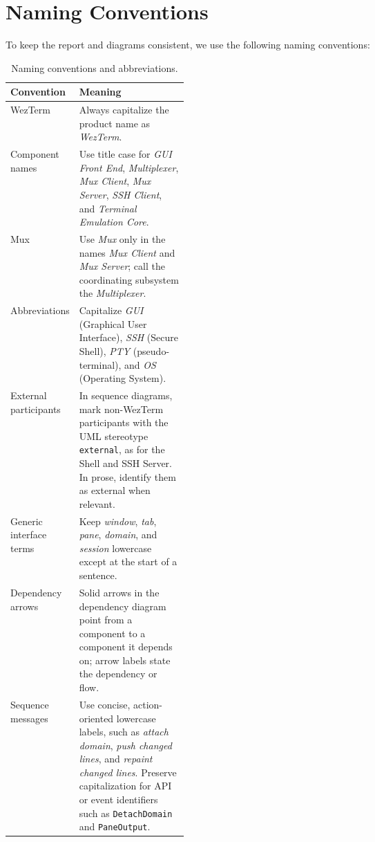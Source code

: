 \section{Naming Conventions}
\label{sec:naming-conventions}

To keep the report and diagrams consistent, we use the following naming conventions:

\begin{table}[!htbp]
  \centering
  \caption{Naming conventions and abbreviations.}
  \label{tab:naming-conventions}
  \begin{tabularx}{\linewidth}{@{}p{0.30\linewidth}X@{}}
    \toprule
    \textbf{Convention} & \textbf{Meaning} \\
    \midrule
    WezTerm & Always capitalize the product name as \textit{WezTerm}. \\
    Component names & Use title case for \textit{GUI Front End}, \textit{Multiplexer}, \textit{Mux Client}, \textit{Mux Server}, \textit{SSH Client}, and \textit{Terminal Emulation Core}. \\
    Mux & Use \textit{Mux} only in the names \textit{Mux Client} and \textit{Mux Server}; call the coordinating subsystem the \textit{Multiplexer}. \\
    Abbreviations & Capitalize \textit{GUI} (Graphical User Interface), \textit{SSH} (Secure Shell), \textit{PTY} (pseudo-terminal), and \textit{OS} (Operating System). \\
    External participants & In sequence diagrams, mark non-WezTerm participants with the UML stereotype \texttt{\guillemotleft{}external\guillemotright{}}, as for the Shell and SSH Server. In prose, identify them as external when relevant. \\
    Generic interface terms & Keep \textit{window}, \textit{tab}, \textit{pane}, \textit{domain}, and \textit{session} lowercase except at the start of a sentence. \\
    Dependency arrows & Solid arrows in the dependency diagram point from a component to a component it depends on; arrow labels state the dependency or flow. \\
    Sequence messages & Use concise, action-oriented lowercase labels, such as \textit{attach domain}, \textit{push changed lines}, and \textit{repaint changed lines}. Preserve capitalization for API or event identifiers such as \texttt{DetachDomain} and \texttt{PaneOutput}. \\
    \bottomrule
  \end{tabularx}
\end{table}
